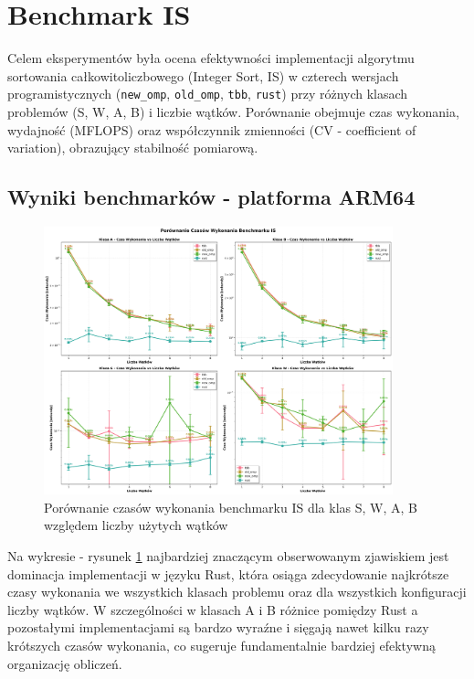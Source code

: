 
\section{Benchmark IS}
Celem eksperymentów była ocena efektywności implementacji algorytmu sortowania całkowitoliczbowego (Integer Sort, IS) w czterech wersjach programistycznych (\texttt{new\_omp}, \texttt{old\_omp}, \texttt{tbb}, \texttt{rust}) przy różnych klasach problemów (S, W, A, B) i liczbie wątków. Porównanie obejmuje czas wykonania, wydajność (MFLOPS) oraz współczynnik zmienności (CV - coefficient of variation), obrazujący stabilność pomiarową.

\subsection{Wyniki benchmarków - platforma ARM64}
\begin{figure}[!h]
    \centering
    \includegraphics[width=0.9\textwidth]{analiza/images/parallel/is/arm/is_porownanie_czasow_wykonania.png}
    \caption{Porównanie czasów wykonania benchmarku IS dla klas S, W, A, B względem liczby użytych wątków}
    \label{is_porownanie_czasow_wykonania}
\end{figure}

Na wykresie - rysunek \ref{is_porownanie_czasow_wykonania} najbardziej znaczącym obserwowanym zjawiskiem jest dominacja implementacji w języku Rust, która osiąga zdecydowanie najkrótsze czasy wykonania we wszystkich klasach problemu oraz dla wszystkich konfiguracji liczby wątków. W szczególności w klasach A i B różnice pomiędzy Rust a pozostałymi implementacjami są bardzo wyraźne i sięgają nawet kilku razy krótszych czasów wykonania, co sugeruje fundamentalnie bardziej efektywną organizację obliczeń.

